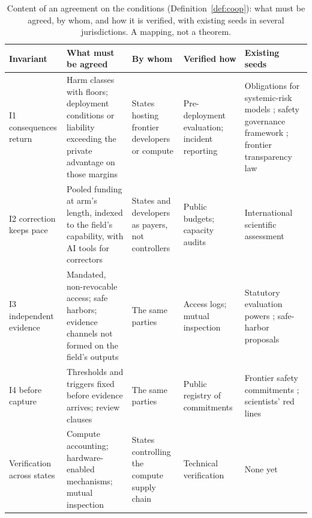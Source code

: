 \documentclass[letterpaper]{article} %
\theoremstyle{definition}
\begin{document}
\begin{table}[t]
\centering
\small
\setlength{\tabcolsep}{3.5pt}
\begin{tabular}{@{}>{\raggedright\arraybackslash}p{2.3cm}>{\raggedright\arraybackslash}p{4.6cm}>{\raggedright\arraybackslash}p{2.9cm}>{\raggedright\arraybackslash}p{3.0cm}>{\raggedright\arraybackslash}p{4.3cm}@{}}
\toprule
Invariant & What must be agreed & By whom & Verified how & Existing seeds \\
\midrule
I1 consequences return & Harm classes with floors; deployment conditions or liability exceeding the private advantage on those margins & States hosting frontier developers or compute & Pre-deployment evaluation; incident reporting & Obligations for systemic-risk models \citep{euaiact2024,gpaicode2025}; safety governance framework \citep{tc260framework2024}; frontier transparency law \citep{sb53} \\
I2 correction keeps pace & Pooled funding at arm's length, indexed to the field's capability, with AI tools for correctors & States and developers as payers, not controllers & Public budgets; capacity audits & International scientific assessment \citep{bengio2025report,unpanel2025} \\
I3 independent evidence & Mandated, non-revocable access; safe harbors; evidence channels not formed on the field's outputs & The same parties & Access logs; mutual inspection & Statutory evaluation powers \citep{euaiact2024}; safe-harbor proposals \citep{longpre2024} \\
I4 before capture & Thresholds and triggers fixed before evidence arrives; review clauses & The same parties & Public registry of commitments & Frontier safety commitments \citep{seoul2024}; scientists' red lines \citep{idais2024} \\
Verification across states & Compute accounting; hardware-enabled mechanisms; mutual inspection & States controlling the compute supply chain & Technical verification \citep{shavit2023,wasil2024} & None yet \\
\bottomrule
\end{tabular}
\caption{Content of an agreement on the conditions (Definition~\ref{def:coop}): what must be agreed, by whom, and how it is verified, with existing seeds in several jurisdictions. A mapping, not a theorem.}
\label{tab:coop}
\end{table}
\end{document}
